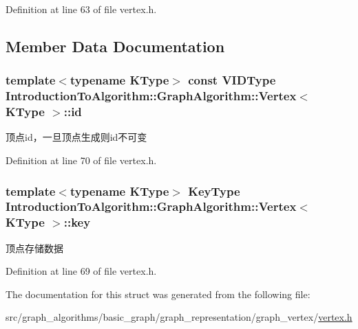Definition at line 63 of file vertex.\+h.



\subsection{Member Data Documentation}
\hypertarget{struct_introduction_to_algorithm_1_1_graph_algorithm_1_1_vertex_a76668b285452856d184a245b7b35b7c1}{}
\subsubsection[{id}]{\setlength{\rightskip}{0pt plus 5cm}template$<$typename K\+Type$>$ const {\bf V\+I\+D\+Type} {\bf Introduction\+To\+Algorithm\+::\+Graph\+Algorithm\+::\+Vertex}$<$ K\+Type $>$\+::id}\label{struct_introduction_to_algorithm_1_1_graph_algorithm_1_1_vertex_a76668b285452856d184a245b7b35b7c1}
顶点id，一旦顶点生成则id不可变 

Definition at line 70 of file vertex.\+h.

\hypertarget{struct_introduction_to_algorithm_1_1_graph_algorithm_1_1_vertex_a5bcfb4e0ba9450b8ebb2543069772d1f}{}
\subsubsection[{key}]{\setlength{\rightskip}{0pt plus 5cm}template$<$typename K\+Type$>$ {\bf Key\+Type} {\bf Introduction\+To\+Algorithm\+::\+Graph\+Algorithm\+::\+Vertex}$<$ K\+Type $>$\+::key}\label{struct_introduction_to_algorithm_1_1_graph_algorithm_1_1_vertex_a5bcfb4e0ba9450b8ebb2543069772d1f}
顶点存储数据 

Definition at line 69 of file vertex.\+h.



The documentation for this struct was generated from the following file\+:\begin{DoxyCompactItemize}
\item 
src/graph\+\_\+algorithms/basic\+\_\+graph/graph\+\_\+representation/graph\+\_\+vertex/\hyperlink{vertex_8h}{vertex.\+h}\end{DoxyCompactItemize}
